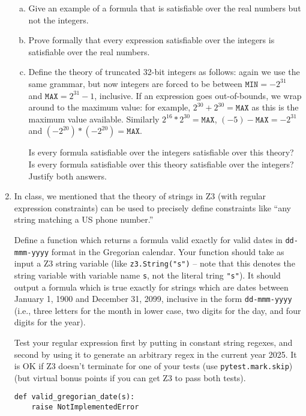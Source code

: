 \documentclass{article}
\begin{document}
\begin{enumerate}
\begin{enumerate}[(a)]
\item Give an example of a formula that is satisfiable over the real numbers but not the integers.
\item Prove formally that every expression satisfiable over the integers is satisfiable over the real numbers.
\item Define the theory of truncated 32-bit integers as follows: again we use the same grammar, but now integers are forced to be between $\texttt{MIN} = -2^{31}$ and $\texttt{MAX} = 2^{31} - 1$, inclusive. If an expression goes out-of-bounds, we wrap around to the maximum value: for example, $2^{30} + 2^{30} = \texttt{MAX}$ as this is the maximum value available. Similarly $2^{16} * 2^{30} = \texttt{MAX}$, $(-5) - \texttt{MAX} = -2^{31}$ and $(-2^{20}) * (-2^{20}) = \texttt{MAX}$.

Is every formula satisfiable over the integers satisfiable over this theory?
Is every formula satisfiable over this theory satisfiable over the integers?
Justify both answers.
\end{enumerate}

\item
In class, we mentioned that the theory of strings in Z3 (with regular expression constraints)
can be used to precisely define constraints like ``any string matching a US phone number.''

Define a function which returns a formula valid exactly for valid dates in \texttt{dd-mmm-yyyy} format
in the Gregorian calendar.
Your function should take as input a Z3 string variable (like \texttt{z3.String("s")} -- note that this denotes
the string variable with variable name \texttt{s}, not the literal tring \texttt{"s"}).
It should output a formula which is true exactly for strings which are dates
between January 1, 1900 and December 31, 2099, inclusive in the form \texttt{dd-mmm-yyyy}
(i.e., three letters for the month in lower case, two digits for the day, and four digits for the year).

Test your regular expression first by putting in constant string regexes, and second
by using it to generate an arbitrary regex in the current year 2025.
It is OK if Z3 doesn't terminate for one of your tests (use \texttt{pytest.mark.skip})
(but virtual bonus points if you can get Z3 to pass both tests).

\begin{verbatim}
def valid_gregorian_date(s):
    raise NotImplementedError


\end{verbatim}
\end{enumerate}
\end{document}
